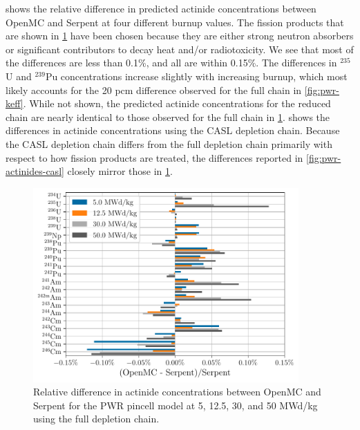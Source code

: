 \documentclass[3p,authoryear]{elsarticle}
\begin{document}
 shows the relative difference in predicted
actinide concentrations between OpenMC and Serpent at four different burnup
values. The fission products that are shown in \cref{fig:pwr-actinides-full}
have been chosen because they are either strong neutron absorbers or significant
contributors to decay heat and/or radiotoxicity. We see that most of the
differences are less than 0.1\%, and all are within 0.15\%. The differences in
$^{235}$U and $^{239}$Pu concentrations increase slightly with increasing
burnup, which most likely accounts for the 20 pcm difference observed for the
full chain in \cref{fig:pwr-keff}. While not shown, the predicted actinide
concentrations for the reduced chain are nearly identical to those observed for
the full chain in \cref{fig:pwr-actinides-full}. 
shows the differences in actinide concentrations using the CASL depletion chain.
Because the CASL depletion chain differs from the full depletion chain primarily
with respect to how fission products are treated, the differences reported in
\cref{fig:pwr-actinides-casl} closely mirror those in
\cref{fig:pwr-actinides-full}.
\begin{figure}[H]
  \centering
  \includegraphics[width=4in]{figures/pwr_actinides_full.pdf}
  \caption{Relative difference in actinide concentrations between OpenMC and
  Serpent for the PWR pincell model at 5, 12.5, 30, and 50 MWd/kg using the full
  depletion chain.}
  \label{fig:pwr-actinides-full}
\end{figure}
\end{document}
